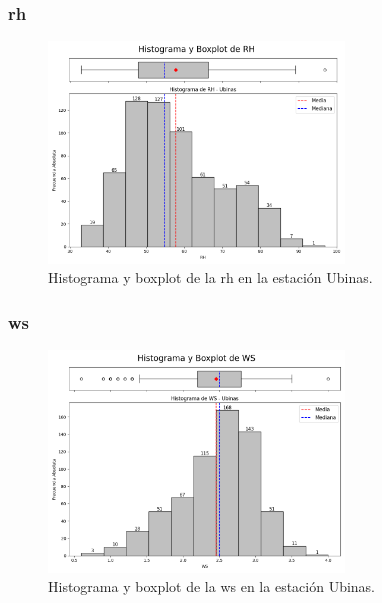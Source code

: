 \subsubsection*{\gls{rh} }
\begin{figure}[htbp]
\centering
\includegraphics[width=0.7\textwidth]{resultados/por_estacion_meteorologica/Ubinas/RH_histograma.png}
\caption{Histograma y boxplot de la \gls{rh}  en la estación Ubinas.}
\label{fig:ubinas_RH}
\end{figure}

\subsubsection*{\gls{ws} }
\begin{figure}[htbp]
\centering
\includegraphics[width=0.7\textwidth]{resultados/por_estacion_meteorologica/Ubinas/WS_histograma.png}
\caption{Histograma y boxplot de la \gls{ws}  en la estación Ubinas.}
\label{fig:ubinas_WS}
\end{figure}

